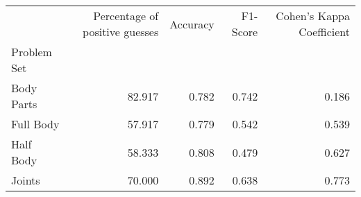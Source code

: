 \begin{table}
    \caption[]{}
    \label{}
    \begin{tabular}{lrrrr}
\hline
{} &  Percentage of positive guesses &  Accuracy &  F1-Score &  Cohen's Kappa Coefficient \\
Problem Set   &                                 &           &           &                            \\
\hline
Body Parts &                          82.917 &     0.782 &     0.742 &                      0.186 \\
Full Body  &                          57.917 &     0.779 &     0.542 &                      0.539 \\
Half Body  &                          58.333 &     0.808 &     0.479 &                      0.627 \\
Joints     &                          70.000 &     0.892 &     0.638 &                      0.773 \\
\hline
\end{tabular}
\end{table}